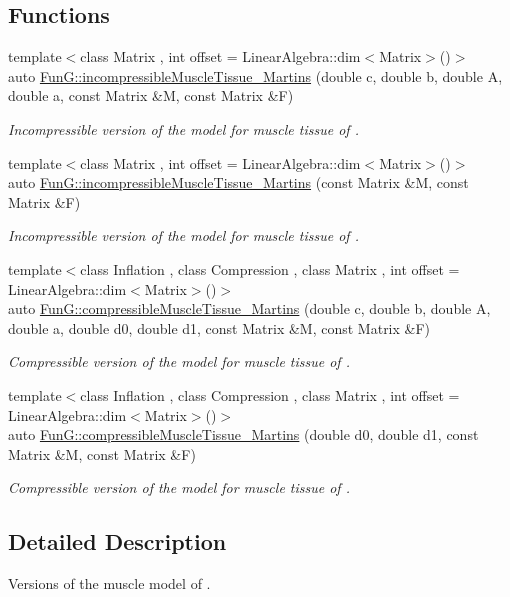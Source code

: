 \subsection*{Functions}
\begin{DoxyCompactItemize}
\item 
{\footnotesize template$<$class Matrix , int offset = Linear\-Algebra\-::dim$<$\-Matrix$>$()$>$ }\\auto \hyperlink{group__Biomechanics_gafcc36a1958899ca9246c4c1b3c9bfd85}{Fun\-G\-::incompressible\-Muscle\-Tissue\-\_\-\-Martins} (double c, double b, double A, double a, const Matrix \&M, const Matrix \&F)
\begin{DoxyCompactList}\small\item\em Incompressible version of the model for muscle tissue of \cite{Martins1998}. \end{DoxyCompactList}\item 
{\footnotesize template$<$class Matrix , int offset = Linear\-Algebra\-::dim$<$\-Matrix$>$()$>$ }\\auto \hyperlink{group__Biomechanics_ga9e414585a90b1988e9fa88d17d875055}{Fun\-G\-::incompressible\-Muscle\-Tissue\-\_\-\-Martins} (const Matrix \&M, const Matrix \&F)
\begin{DoxyCompactList}\small\item\em Incompressible version of the model for muscle tissue of \cite{Martins1998}. \end{DoxyCompactList}\item 
{\footnotesize template$<$class Inflation , class Compression , class Matrix , int offset = Linear\-Algebra\-::dim$<$\-Matrix$>$()$>$ }\\auto \hyperlink{group__Biomechanics_gad831914c493a3da04ed40c3c0ce87a62}{Fun\-G\-::compressible\-Muscle\-Tissue\-\_\-\-Martins} (double c, double b, double A, double a, double d0, double d1, const Matrix \&M, const Matrix \&F)
\begin{DoxyCompactList}\small\item\em Compressible version of the model for muscle tissue of \cite{Martins1998}. \end{DoxyCompactList}\item 
{\footnotesize template$<$class Inflation , class Compression , class Matrix , int offset = Linear\-Algebra\-::dim$<$\-Matrix$>$()$>$ }\\auto \hyperlink{group__Biomechanics_ga46a70ccb2285e12addad87b6a8aaaae8}{Fun\-G\-::compressible\-Muscle\-Tissue\-\_\-\-Martins} (double d0, double d1, const Matrix \&M, const Matrix \&F)
\begin{DoxyCompactList}\small\item\em Compressible version of the model for muscle tissue of \cite{Martins1998}. \end{DoxyCompactList}\end{DoxyCompactItemize}


\subsection{Detailed Description}
Versions of the muscle model of \cite{Martins1998}. 